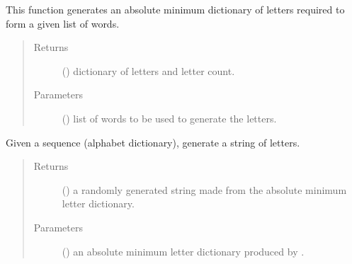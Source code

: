 \documentclass[letterpaper,10pt,english,openany,oneside]{sphinxmanual}
\begin{document}

\begin{fulllineitems}
\label{\detokenize{index:combine.generate_sequence}}
This function generates an absolute minimum dictionary of letters required
to form a given list of words.
\begin{quote}\begin{description}
\item[{Returns}] \leavevmode
() dictionary of letters and letter count.

\item[{Parameters}] \leavevmode
{} () \textendash{} list of words to be used to generate the letters.

\end{description}\end{quote}

\end{fulllineitems}


\begin{fulllineitems}
\label{\detokenize{index:combine.generate_string}}
Given a sequence (alphabet dictionary), generate a string of  letters.
\begin{quote}\begin{description}
\item[{Returns}] \leavevmode
() a randomly generated string made from the absolute minimum letter dictionary.

\item[{Parameters}] \leavevmode
{} () \textendash{} an absolute minimum letter dictionary produced by .

\end{description}\end{quote}

\end{fulllineitems}
\end{document}

